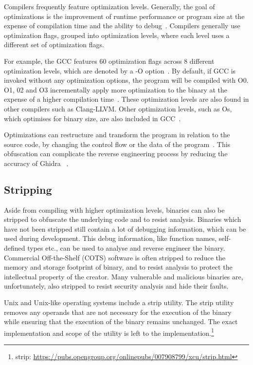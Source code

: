 Compilers frequently feature optimization levels. Generally, the goal of optimizations is the improvement of runtime performance or program size at the expense of compilation time and the ability to debug~\cite{ColeOptimizationLevel}. Compilers generally use optimization flags, grouped into optimization levels, where each level uses a different set of optimization flags.

For example, the GCC features 60 optimization flags across 8 different optimization levels, which are denoted by a -O option~\cite{ColeOptimizationLevel, gccOptimization}. By default, if GCC is invoked without any optimization options, the program will be compiled with O0. O1, 02 and O3 incrementally apply more optimization to the binary at the expense of a higher compilation time~\cite{gccOptimization}. These optimization levels are also found in other compilers such as Clang-LLVM. Other optimization levels, such as Os, which optimises for binary size, are also included in GCC~\cite{gccOptimization}.

Optimizations can restructure and transform the program in relation to the source code, by changing the control flow or the data of the program~\cite{optimizationObfuscation}. This obfuscation can complicate the reverse engineering process by reducing the accuracy of Ghidra ~\cite{optimizationObfuscation}.  

\subsection{Stripping}
Aside from compiling with higher optimization levels, binaries can also be stripped to obfuscate the underlying code and to resist analysis\cite{StochFuzz}. Binaries which have not been stripped still contain a lot of debugging information, which can be used during development. This debug information, like function names, self-defined types etc., can be used to analyse and reverse engineer the binary. Commercial Off-the-Shelf (COTS) software is often stripped to reduce the memory and storage footprint of binary, and to resist analysis to protect the intellectual property of the creator. Many vulnerable and malicious binaries are, unfortunately, also stripped to resist security analysis and hide their faults\cite{Debin}.

Unix and Unix-like operating systems include a strip utility. The strip utility removes any operands that are not necessary for the execution of the binary while ensuring that the execution of the binary remains unchanged. The exact implementation and scope of the utility is left to the implementation.\footnote{strip: \url{https://pubs.opengroup.org/onlinepubs/007908799/xcu/strip.html}}

